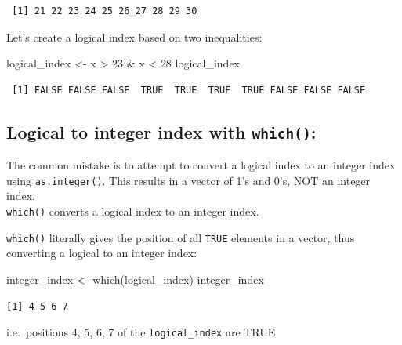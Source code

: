 \documentclass[
]{book}
\newenvironment{Shaded}{\begin{snugshade}}{\end{snugshade}}
\newcommand{\DecValTok}[1]{\textcolor[rgb]{0.00,0.00,0.81}{#1}}
\newcommand{\FunctionTok}[1]{\textcolor[rgb]{0.00,0.00,0.00}{#1}}
\newcommand{\NormalTok}[1]{#1}
\newcommand{\OtherTok}[1]{\textcolor[rgb]{0.56,0.35,0.01}{#1}}
\newcommand{\SpecialCharTok}[1]{\textcolor[rgb]{0.00,0.00,0.00}{#1}}
\begin{document}
\begin{verbatim}
 [1] 21 22 23 24 25 26 27 28 29 30
\end{verbatim}

Let's create a logical index based on two inequalities:

\begin{Shaded}
\begin{Highlighting}[]
\NormalTok{logical\_index }\OtherTok{\textless{}{-}}\NormalTok{ x }\SpecialCharTok{\textgreater{}} \DecValTok{23} \SpecialCharTok{\&}\NormalTok{ x }\SpecialCharTok{\textless{}} \DecValTok{28}
\NormalTok{logical\_index}
\end{Highlighting}
\end{Shaded}

\begin{verbatim}
 [1] FALSE FALSE FALSE  TRUE  TRUE  TRUE  TRUE FALSE FALSE FALSE
\end{verbatim}

\hypertarget{logical-to-integer-index-with-which}{%
\subsection{\texorpdfstring{Logical to integer index with \texttt{which()}:}{Logical to integer index with which():}}\label{logical-to-integer-index-with-which}}

\begin{rmdcaution}
The common mistake is to attempt to convert a logical index to an
integer index using \texttt{as.integer()}. This results in a vector of
1's and 0's, NOT an integer index.\\
\texttt{which()} converts a logical index to an integer index.
\end{rmdcaution}

\texttt{which()} literally gives the position of all \texttt{TRUE} elements in a vector, thus converting a logical to an integer index:

\begin{Shaded}
\begin{Highlighting}[]
\NormalTok{integer\_index }\OtherTok{\textless{}{-}} \FunctionTok{which}\NormalTok{(logical\_index)}
\NormalTok{integer\_index}
\end{Highlighting}
\end{Shaded}

\begin{verbatim}
[1] 4 5 6 7
\end{verbatim}

i.e.~positions 4, 5, 6, 7 of the \texttt{logical\_index} are TRUE
\end{document}
